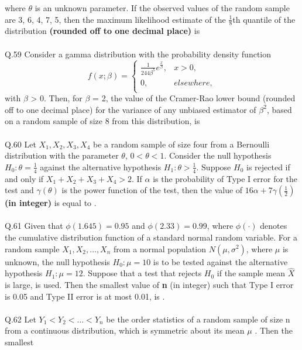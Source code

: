\documentclass{book}[200pt]
\begin{document}
where $\theta$ is an unknown parameter. If the observed values of the random sample are 3, 6, 4, 7, 5, then the maximum likelihood estimate of the $\frac{1}{8}$th quantile of the distribution \textbf{(rounded off to one decimal place)} is \underline{\hspace{2cm}}\\
\\
Q.59 Consider a gamma distribution with the probability density function \[
f(x; \beta) = \begin{cases}
	\frac{1}{244\beta^5}e^{\frac{x}{\beta}}, & x > 0,\\
	0, & elsewhere,\\
	\end{cases}
\]
with $\beta$ > 0. Then, for $\beta$ = 2, the value of the Cramer-Rao lower bound (rounded
off to one decimal place) for the variance of any unbiased estimator of $\beta^2$, based on a random sample of size 8 from this distribution, is \underline{\hspace{2cm}}\\
\\
Q.60 Let $X_1, X_2, X_3, X_4$ be a random sample of size four from a Bernoulli distribution with the parameter $\theta$, $0 < \theta < 1$. Consider the null hypothesis $H_0: \theta = \frac{1}{4}$ against the alternative hypothesis $H_1: \theta > \frac{1}{4}$. Suppose $H_0$ is rejected if and only if $X_1 + X_2 + X_3 + X_4 > 2$. If $\alpha$ is the probability of Type I error for the test and $\gamma(\theta)$ is the power function of the test, then the value of $16\alpha + 7 \gamma \left(\frac{1}{2}\right)$ \textbf{(in integer)} is equal to \underline{\hspace{5cm}}.\\
\\
Q.61 Given that $\phi(1.645) = 0.95$ and $\phi(2.33) = 0.99$, where $\phi(\cdot)$ denotes the cumulative distribution function of a standard normal random variable. For a random sample $X_1, X_2, \dots, X_n$ from a normal population $N(\mu, \sigma^2)$, where $\mu$ is unknown, the null hypothesis $H_0: \mu = 10$ is to be tested against the alternative hypothesis $H_1: \mu = 12$. Suppose that a test that rejects $H_0$ if the sample mean $\hat{X}$ is large, is used. Then the smallest value of \textbf{n} (in integer) such that Type I error is
0.05 and Type II error is at most 0.01, is \underline{\hspace{2cm}}.\\
\\
Q.62 Let $Y_1 < Y_2 < \dots < Y_n$ be the order statistics of a random sample of size n from a continuous distribution, which is symmetric about its mean $\mu$ . Then the smallest
\end{document}
